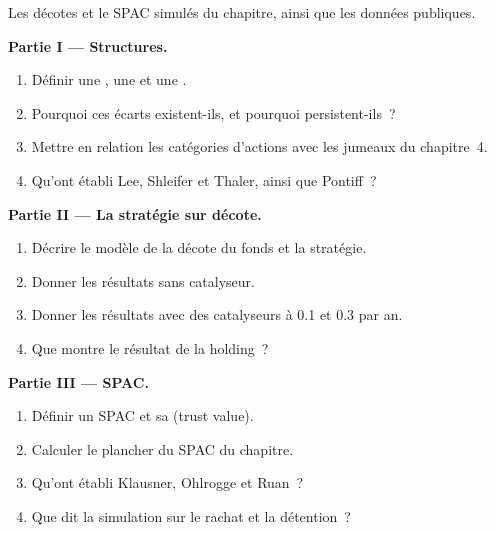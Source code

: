 \begin{problem}\label{pb:s1:share-classes-holding-companies-closed-end-funds-spacs:1}
Les décotes et le SPAC simulés du chapitre, ainsi que les données publiques.

\medskip\noindent\textbf{Partie I --- Structures.}
\begin{enumerate}
\item Définir une , une  et une .
\item Pourquoi ces écarts existent-ils, et pourquoi persistent-ils~?
\item Mettre en relation les catégories d'actions avec les jumeaux du chapitre~4.
\item Qu'ont établi Lee, Shleifer et Thaler, ainsi que Pontiff~?
\end{enumerate}

\medskip\noindent\textbf{Partie II --- La stratégie sur décote.}
\begin{enumerate}[resume]
\item Décrire le modèle de la décote du fonds et la stratégie.
\item Donner les résultats sans catalyseur.
\item Donner les résultats avec des catalyseurs à 0.1 et 0.3 par an.
\item Que montre le résultat de la holding~?
\end{enumerate}

\medskip\noindent\textbf{Partie III --- SPAC.}
\begin{enumerate}[resume]
\item Définir un SPAC et sa  (trust value).
\item Calculer le plancher du SPAC du chapitre.
\item Qu'ont établi Klausner, Ohlrogge et Ruan~?
\item Que dit la simulation sur le rachat et la détention~?
\end{enumerate}


\end{problem}
